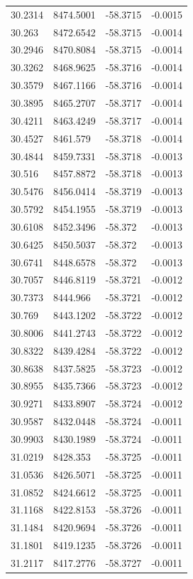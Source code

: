 \begin{table}[H]
\begin{tabular}{llll}
30.2314 & 8474.5001 & -58.3715 & -0.0015 \\
30.263 & 8472.6542 & -58.3715 & -0.0014 \\
30.2946 & 8470.8084 & -58.3715 & -0.0014 \\
30.3262 & 8468.9625 & -58.3716 & -0.0014 \\
30.3579 & 8467.1166 & -58.3716 & -0.0014 \\
30.3895 & 8465.2707 & -58.3717 & -0.0014 \\
30.4211 & 8463.4249 & -58.3717 & -0.0014 \\
30.4527 & 8461.579 & -58.3718 & -0.0014 \\
30.4844 & 8459.7331 & -58.3718 & -0.0013 \\
30.516 & 8457.8872 & -58.3718 & -0.0013 \\
30.5476 & 8456.0414 & -58.3719 & -0.0013 \\
30.5792 & 8454.1955 & -58.3719 & -0.0013 \\
30.6108 & 8452.3496 & -58.372 & -0.0013 \\
30.6425 & 8450.5037 & -58.372 & -0.0013 \\
30.6741 & 8448.6578 & -58.372 & -0.0013 \\
30.7057 & 8446.8119 & -58.3721 & -0.0012 \\
30.7373 & 8444.966 & -58.3721 & -0.0012 \\
30.769 & 8443.1202 & -58.3722 & -0.0012 \\
30.8006 & 8441.2743 & -58.3722 & -0.0012 \\
30.8322 & 8439.4284 & -58.3722 & -0.0012 \\
30.8638 & 8437.5825 & -58.3723 & -0.0012 \\
30.8955 & 8435.7366 & -58.3723 & -0.0012 \\
30.9271 & 8433.8907 & -58.3724 & -0.0012 \\
30.9587 & 8432.0448 & -58.3724 & -0.0011 \\
30.9903 & 8430.1989 & -58.3724 & -0.0011 \\
31.0219 & 8428.353 & -58.3725 & -0.0011 \\
31.0536 & 8426.5071 & -58.3725 & -0.0011 \\
31.0852 & 8424.6612 & -58.3725 & -0.0011 \\
31.1168 & 8422.8153 & -58.3726 & -0.0011 \\
31.1484 & 8420.9694 & -58.3726 & -0.0011 \\
31.1801 & 8419.1235 & -58.3726 & -0.0011 \\
31.2117 & 8417.2776 & -58.3727 & -0.0011 \\

\end{tabular}
\end{table}
